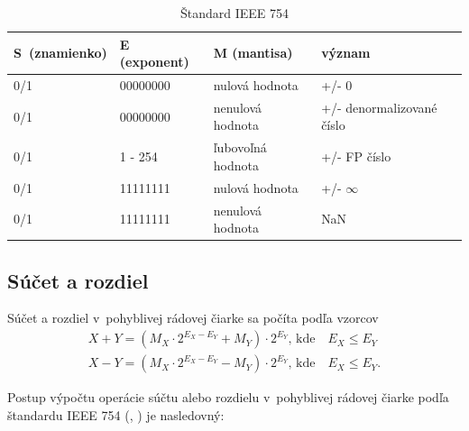 \bigskip
\begin{table}[h]
\centering
\begin{tabular}{|l|l|l|l|}
\hline
\rowcolor[HTML]{68CBD0} 
S~(znamienko) & E (exponent) & M (mantisa)       & význam                    \\ \hline
0/1           & 00000000     & nulová hodnota    & +/- 0                     \\ \hline
0/1           & 00000000     & nenulová hodnota  & +/- denormalizované číslo \\ \hline
0/1           & 1 - 254      & ľubovoľná hodnota & +/- FP číslo              \\ \hline
0/1           & 11111111     & nulová hodnota    & +/- $ \infty  $           \\ \hline
0/1           & 11111111     & nenulová hodnota  & NaN                       \\ \hline
\end{tabular}
\caption{Štandard IEEE 754 \cite{FPOnline}}
\label{standard_IEEE754}
\end{table}

\newpage
\subsection{Súčet a rozdiel} \label{PlusMinusFP}
Súčet a rozdiel v~pohyblivej rádovej čiarke sa počíta podľa vzorcov
\begin{eqnarray}
X + Y = (M_{X}\cdot 2^{E_{X} - E_{Y}} + M_{Y})\cdot 2^{E_{Y}} \text{, kde} \quad E_{X} \leq E_{Y} \\
X - Y = (M_{X}\cdot 2^{E_{X} - E_{Y}} - M_{Y})\cdot 2^{E_{Y}} \text{, kde} \quad E_{X} \leq E_{Y} .
\end{eqnarray}

Postup výpočtu operácie súčtu alebo rozdielu v~pohyblivej rádovej čiarke podľa štandardu IEEE 754 (\cite{FPOnline_operacie}, \cite{CamborBP}) je nasledovný:


